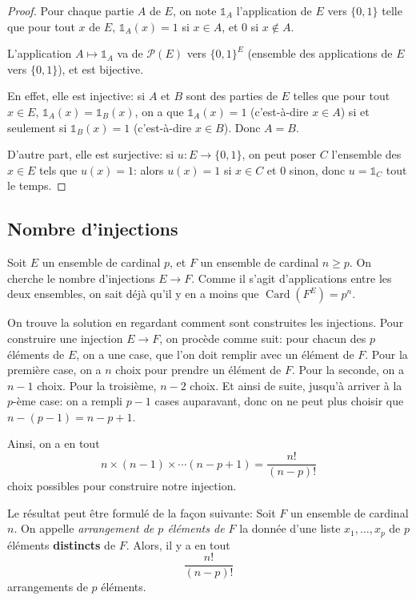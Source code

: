 \documentclass[twoside,11pt]{article}
\DeclareMathOperator{\Card}{\mathrm{Card}}
\theoremstyle{definition}
\theoremstyle{remark}
\theoremstyle{theorem}
\begin{document}
\begin{proof}
	Pour chaque partie $A$ de $E$, on note $\mathbb{1}_A$ l'application de $E$ vers $\{0,1\}$ telle que pour tout $x$ de $E$, $\mathbb{1}_A(x)= 1$ si $x\in A$, et $0$ si $x\not\in A$.
	
	L'application $A\longmapsto\mathbb{1}_A$ va de $\mathcal{P}(E)$ vers $\{0,1\}^E$ (ensemble des applications de $E$ vers $\{0,1\}$), et est bijective. 
	
	En effet, elle est injective: si $A$ et $B$ sont des parties de $E$ telles que pour tout $x\in E$, $\mathbb 1_A(x) = \mathbb 1_B(x)$, on a que $\mathbb 1_A(x) = 1$ (c'est-à-dire $x\in A$) si et seulement si $\mathbb 1_B(x) = 1$ (c'est-à-dire $x\in B$). Donc $A=B$.
	
	D'autre part, elle est surjective: si $u:E\rightarrow\{0,1\}$, on peut poser $C$ l'ensemble des $x\in E$ tels que $u(x) = 1$: alors $u(x) = 1$ si $x\in C$ et $0$ sinon, donc $u = \mathbb 1_C$ tout le temps.
\end{proof}

\subsection{Nombre d'injections}

Soit $E$ un ensemble de cardinal $p$, et $F$ un ensemble de cardinal $n\geq p$. On cherche le nombre d'injections $E\rightarrow F$. Comme il s'agit d'applications entre les deux ensembles, on sait déjà qu'il y en a moins que $\Card(F^E) = p^n$.

On trouve la solution en regardant comment sont construites les injections. Pour construire une injection $E\rightarrow F$, on procède comme suit: pour chacun des $p$ éléments de $E$, on a une case, que l'on doit remplir avec un élément de $F$. Pour la première case, on a $n$ choix pour prendre un élément de $F$. Pour la seconde, on a $n-1$ choix. Pour la troisième, $n-2$ choix. Et ainsi de suite, jusqu'à arriver à la $p$-ème case: on a rempli $p-1$ cases auparavant, donc on ne peut plus choisir que $n-(p-1)=n-p+1$.

Ainsi, on a en tout
\[
n\times (n-1)\times \cdots (n-p+1) = \frac{n!}{(n-p)!}
\]
choix possibles pour construire notre injection.

\begin{rem}
Le résultat peut être formulé de la façon suivante: Soit $F$ un ensemble de cardinal $n$. On appelle \textit{arrangement de $p$ éléments de $F$} la donnée d'une liste $x_1,\ldots,x_p$ de $p$ éléments \textbf{distincts} de $F$. Alors, il y a en tout
\[
\frac{n!}{(n-p)!}
\]
arrangements de $p$ éléments.
\end{rem}
\end{document}
